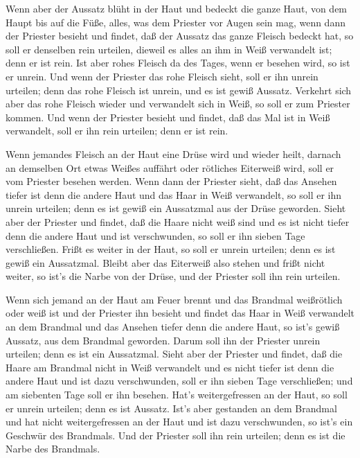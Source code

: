  Wenn aber der Aussatz blüht in der Haut und bedeckt die
ganze Haut, von dem Haupt bis auf die Füße, alles, was dem Priester vor
Augen sein mag,  wenn dann der Priester besieht und findet,
daß der Aussatz das ganze Fleisch bedeckt hat, so soll er denselben rein
urteilen, dieweil es alles an ihm in Weiß verwandelt ist; denn er ist
rein.  Ist aber rohes Fleisch da des Tages, wenn er besehen
wird, so ist er unrein.  Und wenn der Priester das rohe
Fleisch sieht, soll er ihn unrein urteilen; denn das rohe Fleisch ist
unrein, und es ist gewiß Aussatz.  Verkehrt sich aber das
rohe Fleisch wieder und verwandelt sich in Weiß, so soll er zum Priester
kommen.  Und wenn der Priester besieht und findet, daß das
Mal ist in Weiß verwandelt, soll er ihn rein urteilen; denn er ist rein.

 Wenn jemandes Fleisch an der Haut eine Drüse wird und
wieder heilt,  darnach an demselben Ort etwas Weißes
auffährt oder rötliches Eiterweiß wird, soll er vom Priester besehen
werden.  Wenn dann der Priester sieht, daß das Ansehen
tiefer ist denn die andere Haut und das Haar in Weiß verwandelt, so soll
er ihn unrein urteilen; denn es ist gewiß ein Aussatzmal aus der Drüse
geworden.  Sieht aber der Priester und findet, daß die
Haare nicht weiß sind und es ist nicht tiefer denn die andere Haut und
ist verschwunden, so soll er ihn sieben Tage verschließen. 
Frißt es weiter in der Haut, so soll er unrein urteilen; denn es ist
gewiß ein Aussatzmal.  Bleibt aber das Eiterweiß also
stehen und frißt nicht weiter, so ist's die Narbe von der Drüse, und der
Priester soll ihn rein urteilen.

 Wenn sich jemand an der Haut am Feuer brennt und das
Brandmal weißrötlich oder weiß ist  und der Priester ihn
besieht und findet das Haar in Weiß verwandelt an dem Brandmal und das
Ansehen tiefer denn die andere Haut, so ist's gewiß Aussatz, aus dem
Brandmal geworden. Darum soll ihn der Priester unrein urteilen; denn es
ist ein Aussatzmal.  Sieht aber der Priester und findet,
daß die Haare am Brandmal nicht in Weiß verwandelt und es nicht tiefer
ist denn die andere Haut und ist dazu verschwunden, soll er ihn sieben
Tage verschließen;  und am siebenten Tage soll er ihn
besehen. Hat's weitergefressen an der Haut, so soll er unrein urteilen;
denn es ist Aussatz.  Ist's aber gestanden an dem Brandmal
und hat nicht weitergefressen an der Haut und ist dazu verschwunden, so
ist's ein Geschwür des Brandmals. Und der Priester soll ihn rein
urteilen; denn es ist die Narbe des Brandmals.

